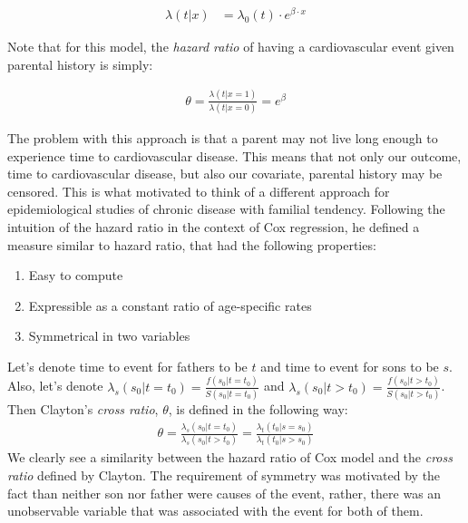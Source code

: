 \documentclass[]{article}
\begin{document}
$$
\begin{aligned}
	\lambda(t|x) &= \lambda_0(t) \cdot e^{\beta\cdot x}
\end{aligned}
$$

Note that for this model, the \emph{hazard ratio} of having a cardiovascular event given parental history is simply:

$$
\begin{aligned}
 \theta = \frac{\lambda(t|x=1)}{\lambda(t|x=0)} = e^{\beta}
 \end{aligned}
$$
 
The problem with this approach is that a parent may not live long enough to experience time to cardiovascular disease. This means that not only our outcome, time to cardiovascular disease, but also our covariate, parental history may be censored. This is what motivated \cite{clayton1978model} to think of a different approach for epidemiological studies of chronic disease with familial tendency. Following the intuition of the hazard ratio in the context of Cox regression, he defined a measure similar to hazard ratio, that had the following properties:
\begin{enumerate}
	\item Easy to compute
	\item Expressible as a constant ratio of age-specific rates
  \item Symmetrical in two variables
\end{enumerate}
Let's denote time to event for fathers to be $t$ and time to event for sons to be $s$. Also, let's denote $\lambda_s(s_0|t=t_0) = \frac{f(s_0|t=t_0)}{S(s_0|t=t_0)}$ and $\lambda_s(s_0|t>t_0) = \frac{f(s_0|t>t_0)}{S(s_0|t>t_0)}$. Then Clayton's \emph{cross ratio}, $\theta$, is defined in the following way:
$$
\begin{aligned}
	\theta = \frac{\lambda_s(s_0|t=t_0)}{\lambda_s(s_0|t>t_0)} = \frac{\lambda_t(t_0|s=s_0)}{\lambda_t(t_0|s>s_0)}
\end{aligned}
$$
We clearly see a similarity between the hazard ratio of Cox model and the \emph{cross ratio} defined by Clayton. The requirement of symmetry was motivated by the fact than neither son nor father were causes of the event, rather, there was an unobservable variable that was associated with the event for both of them.\\
\end{document}
